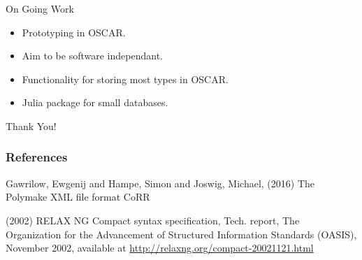 \documentclass[9pt]{beamer}
\theoremstyle{definition}
\begin{document}

\begin{frame}[fragile]{On Going Work}
  \begin{itemize}
  \item Prototyping in OSCAR. \pause
  \item Aim to be software independant. \pause
  \item Functionality for storing most types in OSCAR. \pause
  \item Julia package for small databases. 
  \end{itemize}
\end{frame}


\begin{frame}[fragile]{}
  \begin{center}
    Thank You!
  \end{center}
\end{frame}



\begin{frame}
  \frametitle{References}
  \footnotesize{
    \begin{thebibliography}{99} %
     Gawrilow, Ewgenij and Hampe, Simon and Joswig, Michael, (2016)
    \newblock The Polymake XML file format
    \newblock CoRR 

   (2002)
    \newblock RELAX NG Compact syntax specification,
    \newblock Tech. report, The Organization for the Advancement of Structured Information Standards (OASIS), November 2002,
    \newblock available at \url{http://relaxng.org/compact-20021121.html}
    
    \end{thebibliography}
  }
\end{frame}

\end{document}
